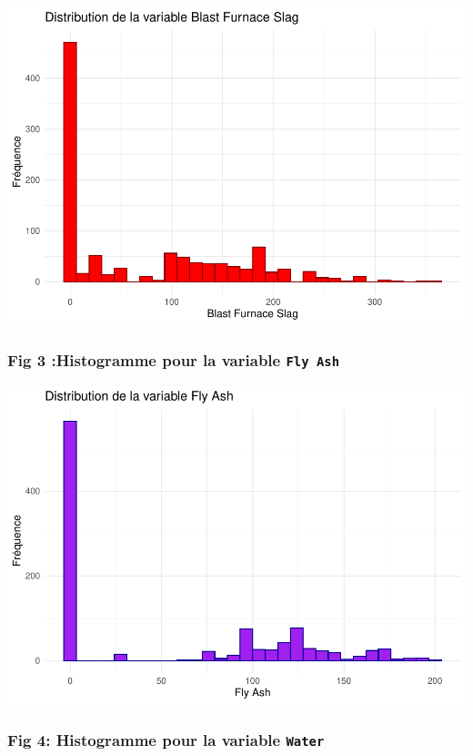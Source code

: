 \documentclass[
  12pt,
]{article}
\begin{document}
\includegraphics{rmd_final_files/figure-latex/unnamed-chunk-24-1.pdf}

\subsubsection{\texorpdfstring{Fig 3 :Histogramme pour la variable
\texttt{Fly\ Ash}}{Fig 3 :Histogramme pour la variable Fly Ash}}\label{fig-3-histogramme-pour-la-variable-fly-ash}

\includegraphics{rmd_final_files/figure-latex/unnamed-chunk-25-1.pdf}

\subsubsection{\texorpdfstring{Fig 4: Histogramme pour la variable
\texttt{Water}}{Fig 4: Histogramme pour la variable Water}}\label{fig-4-histogramme-pour-la-variable-water}
\end{document}
